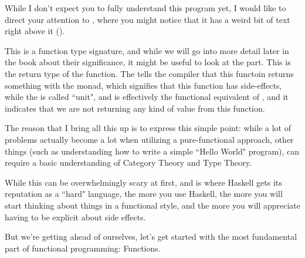 While I don't expect you to fully understand this program yet, I would like to direct your attention to , where you might notice that it has a weird bit of text right above it (). 

This is a function type signature, and while we will go into more detail later in the book about their significance, it might be useful to look at the  part.  This is the return type of the function.  The  tells the compiler that this functoin returns something with the  monad, which signifies that this function has side-effects, while the \inlinecode{()} is called ``unit", and is effectively the functional equivalent of , and it indicates that we are not returning any kind of value from this function. 

The reason that I bring all this up is to express this simple point: while a lot of problems actually become a lot when utilizing a pure-functional approach, other things (such as understanding how to write a simple ``Hello World" program), can require a basic understanding of Category Theory and Type Theory. 

While this can be overwhelmingly scary at first, and is where Haskell gets its reputation as a ``hard" language, the more you use Haskell, the more you will start thinking about things in a functional style, and the more you will appreciate having to be explicit about side effects. 

But we're getting ahead of ourselves, let's get started with the most fundamental part of functional programming: Functions. 


